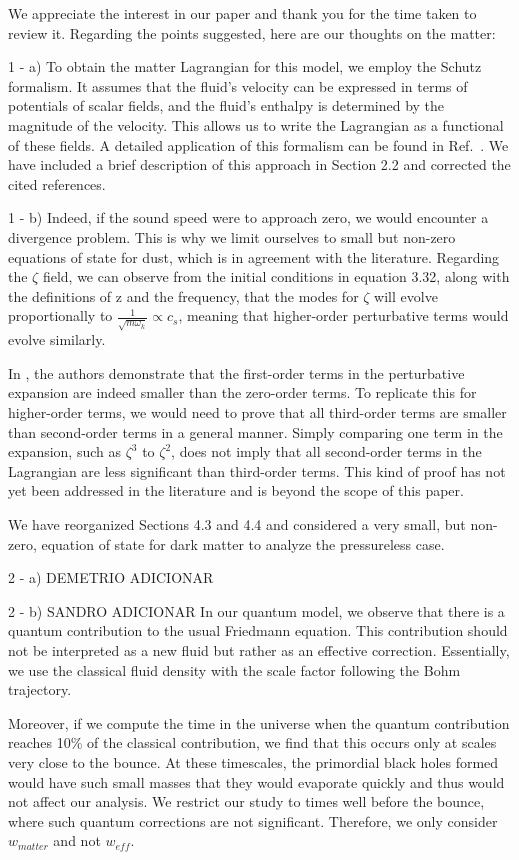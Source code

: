 \documentclass[a4paper,11pt]{article}
\begin{document}
We appreciate the interest in our paper and thank you for the time taken to review it. Regarding the points suggested, here are our thoughts on the matter:


1 - a) To obtain the matter Lagrangian for this model, we employ the Schutz formalism. It assumes that the fluid's velocity can be expressed in terms of potentials of scalar fields, and the fluid's enthalpy is determined by the magnitude of the velocity. This allows us to write the Lagrangian as a functional of these fields. A detailed application of this formalism can be found in Ref.~\cite{fluidgeral}. We have included a brief description of this approach in Section 2.2 and corrected the cited references.

1 - b) Indeed, if the sound speed were to approach zero, we would encounter a divergence problem. This is why we limit ourselves to small but non-zero equations of state for dust, which is in agreement with the literature. Regarding the $\zeta$ field, we can observe from the initial conditions in equation 3.32, along with the definitions of 
z and the frequency, that the modes for $\zeta$ will evolve proportionally to 
$\frac{1}{\sqrt{m \omega_k}} \propto c_s$, meaning that higher-order perturbative terms would evolve similarly.

In \cite{vitenti}, the authors demonstrate that the first-order terms in the perturbative expansion are indeed smaller than the zero-order terms. To replicate this for higher-order terms, we would need to prove that all third-order terms are smaller than second-order terms in a general manner. Simply comparing one term in the expansion, such as $\zeta^3$ to $\zeta^2$, does not imply that all second-order terms in the Lagrangian are less significant than third-order terms. This kind of proof has not yet been addressed in the literature and is beyond the scope of this paper.

We have reorganized Sections 4.3 and 4.4 and considered a very small, but non-zero, equation of state for dark matter to analyze the pressureless case.

2 - a) DEMETRIO ADICIONAR

2 - b) SANDRO ADICIONAR In our quantum model, we observe that there is a quantum contribution to the usual Friedmann equation. This contribution should not be interpreted as a new fluid but rather as an effective correction. Essentially, we use the classical fluid density with the scale factor following the Bohm trajectory.

Moreover, if we compute the time in the universe when the quantum contribution reaches 10\% of the classical contribution, we find that this occurs only at scales very close to the bounce. At these timescales, the primordial black holes formed would have such small masses that they would evaporate quickly and thus would not affect our analysis. We restrict our study to times well before the bounce, where such quantum corrections are not significant. Therefore, we only consider $w_{matter}$ and not $w_{eff}$.
\end{document}
